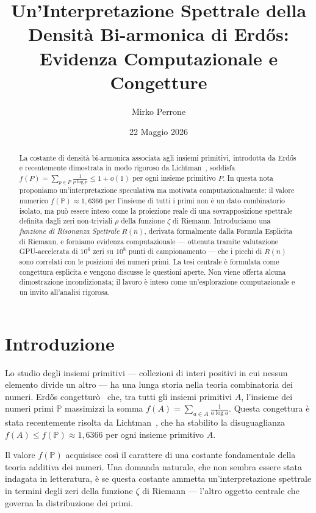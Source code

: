 \documentclass[11pt,a4paper]{article}
\title{\textbf{Un'Interpretazione Spettrale della Densit\`a Bi-armonica di Erd\H{o}s:\\
Evidenza Computazionale e Congetture}}
\author{Mirko Perrone}
\date{22 Maggio 2026}
\begin{document}
\maketitle

\begin{abstract}
La costante di densit\`a bi-armonica associata agli insiemi primitivi, introdotta da
Erd\H{o}s e recentemente dimostrata in modo rigoroso da Lichtman~\cite{lichtman2019},
soddisfa $f(P) = \sum_{p \in P} \frac{1}{p \log p} \leq 1 + o(1)$ per ogni insieme
primitivo $P$. In questa nota proponiamo un'interpretazione speculativa ma motivata
computazionalmente: il valore numerico $f(\mathbb{P}) \approx 1{,}6366$ per l'insieme
di tutti i primi non \`e un dato combinatorio isolato, ma pu\`o essere inteso come
la proiezione reale di una sovrapposizione spettrale definita dagli zeri non-triviali
$\rho$ della funzione $\zeta$ di Riemann. Introduciamo una \emph{funzione di Risonanza
Spettrale} $R(n)$, derivata formalmente dalla Formula Esplicita di Riemann, e
forniamo evidenza computazionale --- ottenuta tramite valutazione GPU-accelerata di
$10^6$ zeri su $10^8$ punti di campionamento --- che i picchi di $R(n)$ sono
correlati con le posizioni dei numeri primi. La tesi centrale \`e formulata come
congettura esplicita e vengono discusse le questioni aperte. Non viene offerta alcuna
dimostrazione incondizionata; il lavoro \`e inteso come un'esplorazione computazionale
e un invito all'analisi rigorosa.
\end{abstract}

\section{Introduzione}

Lo studio degli insiemi primitivi --- collezioni di interi positivi in cui nessun
elemento divide un altro --- ha una lunga storia nella teoria combinatoria dei numeri.
Erd\H{o}s congettur\`o~\cite{erdos1948} che, tra tutti gli insiemi primitivi $A$,
l'insieme dei numeri primi $\mathbb{P}$ massimizzi la somma
$f(A) = \sum_{a \in A} \frac{1}{a \log a}$.
Questa congettura \`e stata recentemente risolta da Lichtman~\cite{lichtman2019},
che ha stabilito la disuguaglianza $f(A) \leq f(\mathbb{P}) \approx 1{,}6366$
per ogni insieme primitivo $A$.

Il valore $f(\mathbb{P})$ acquisisce cos\`i il carattere di una costante fondamentale
della teoria additiva dei numeri. Una domanda naturale, che non sembra essere stata
indagata in letteratura, \`e se questa costante ammetta un'interpretazione spettrale
in termini degli zeri della funzione $\zeta$ di Riemann --- l'altro oggetto centrale
che governa la distribuzione dei primi.
\end{document}
